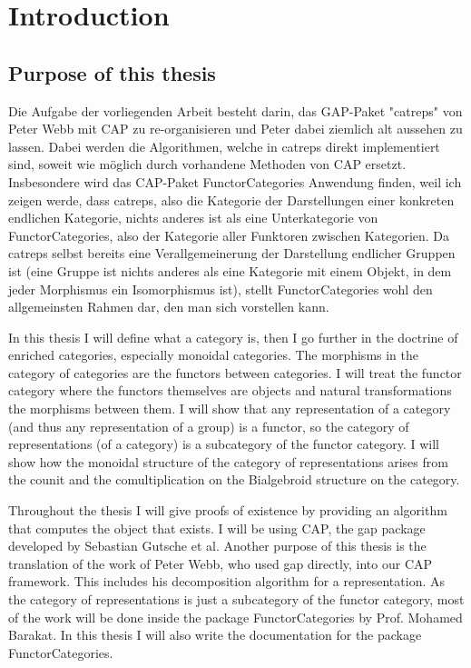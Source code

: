 
\section{Introduction}

\subsection{Purpose of this thesis}

Die Aufgabe der vorliegenden Arbeit besteht darin, das GAP-Paket "catreps" von Peter Webb mit CAP zu re-organisieren und Peter dabei ziemlich alt aussehen zu lassen. Dabei werden die Algorithmen, welche in catreps direkt implementiert sind, soweit wie möglich durch vorhandene Methoden von CAP ersetzt.
Insbesondere wird das CAP-Paket FunctorCategories Anwendung finden, weil ich zeigen werde, dass catreps, also die Kategorie der Darstellungen einer konkreten endlichen Kategorie, nichts anderes ist als eine Unterkategorie von FunctorCategories, also der Kategorie aller Funktoren zwischen Kategorien. 
Da catreps selbst bereits eine Verallgemeinerung der Darstellung endlicher Gruppen ist (eine Gruppe ist nichts anderes als eine Kategorie mit einem Objekt, in dem jeder Morphismus ein Isomorphismus ist), stellt FunctorCategories wohl den allgemeinsten Rahmen dar, den man sich vorstellen kann.

In this thesis I will define what a category is, then I go further in the doctrine of enriched categories, especially monoidal categories.
The morphisms in the category of categories are the functors between categories. I will treat the functor category where the functors themselves are
objects and natural transformations the morphisms between them. I will show that any representation of a category (and thus any representation
of a group) is a functor, so the category of representations (of a category) is a subcategory of the functor category.
I will show how the monoidal structure of the category of representations arises from the counit and the comultiplication on the Bialgebroid structure
on the category.

\noindent Throughout the thesis I will give proofs of existence by providing an algorithm that computes the object that exists. I will be using CAP, the gap package
developed by Sebastian Gutsche et al. Another purpose of this thesis is the translation of the work of Peter Webb, who used gap directly, into our CAP
framework. This includes his decomposition algorithm for a representation. As the category of representations is just a subcategory of the functor category,
most of the work will be done inside the package FunctorCategories by Prof. Mohamed Barakat. In this thesis I will also write the documentation for the
package FunctorCategories.
